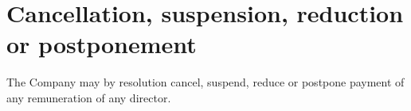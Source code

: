 \section{Cancellation, suspension, reduction or postponement}

The Company may by resolution cancel, suspend, reduce or postpone payment of any remuneration of any director. 